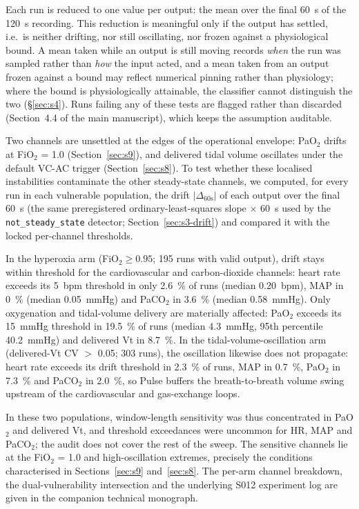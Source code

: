 \documentclass[pdflatex,sn-nature]{sn-jnl}%
\newcommand{\mainref}[2]{#2}
\begin{document}
Each run is reduced to one value per output: the mean over the final 60~s of the 120~s recording. This reduction is meaningful only if the output has settled, i.e.\ is neither drifting, nor still oscillating, nor frozen against a physiological bound. A mean taken while an output is still moving records \emph{when} the run was sampled rather than \emph{how} the input acted, and a mean taken from an output frozen against a bound may reflect numerical pinning rather than physiology; where the bound is physiologically attainable, the classifier cannot distinguish the two (\S\ref{sec:s4}). Runs failing any of these tests are flagged rather than discarded (Section~\mainref{sec:methods-detector}{4.4} of the main manuscript), which keeps the assumption auditable.

Two channels are unsettled at the edges of the operational envelope: PaO$_2$ drifts at FiO$_2$ = 1.0 (Section~\ref{sec:s9}), and delivered tidal volume oscillates under the default VC-AC trigger (Section~\ref{sec:s8}). To test whether these localised instabilities contaminate the other steady-state channels, we computed, for every run in each vulnerable population, the drift $|\Delta_{60\mathrm{s}}|$ of each output over the final 60~s (the same preregistered ordinary-least-squares slope $\times$ 60~s used by the \texttt{not\_steady\_state} detector; Section~\ref{sec:s3-drift}) and compared it with the locked per-channel thresholds.

In the hyperoxia arm (FiO$_2 \geq 0.95$; 195 runs with valid output), drift stays within threshold for the cardiovascular and carbon-dioxide channels: heart rate exceeds its 5~bpm threshold in only 2.6~\% of runs (median 0.20~bpm), MAP in 0~\% (median 0.05~mmHg) and PaCO$_2$ in 3.6~\% (median 0.58~mmHg). Only oxygenation and tidal-volume delivery are materially affected: PaO$_2$ exceeds its 15~mmHg threshold in 19.5~\% of runs (median 4.3~mmHg, 95th percentile 40.2~mmHg) and delivered Vt in 8.7~\%. In the tidal-volume-oscillation arm (delivered-Vt CV $>$ 0.05; 303 runs), the oscillation likewise does not propagate: heart rate exceeds its drift threshold in 2.3~\% of runs, MAP in 0.7~\%, PaO$_2$ in 7.3~\% and PaCO$_2$ in 2.0~\%, so Pulse buffers the breath-to-breath volume swing upstream of the cardiovascular and gas-exchange loops.

In these two populations, window-length sensitivity was thus concentrated in PaO$_2$ and delivered Vt, and threshold exceedances were uncommon for HR, MAP and PaCO$_2$; the audit does not cover the rest of the sweep. The sensitive channels lie at the FiO$_2$ = 1.0 and high-oscillation extremes, precisely the conditions characterised in Sections~\ref{sec:s9} and~\ref{sec:s8}. The per-arm channel breakdown, the dual-vulnerability intersection and the underlying S012 experiment log are given in the companion technical monograph.
\end{document}
